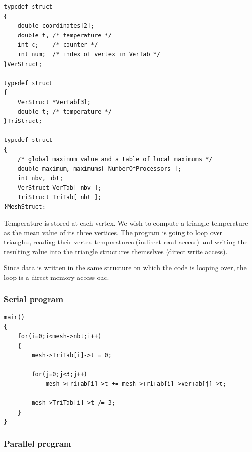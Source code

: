 \documentclass[a4paper,12pt]{article}
\begin{document}
\begin{tt}
\begin{verbatim}
typedef struct
{
    double coordinates[2];
    double t; /* temperature */
    int c;    /* counter */
    int num;  /* index of vertex in VerTab */
}VerStruct;

typedef struct
{
    VerStruct *VerTab[3];
    double t; /* temperature */
}TriStruct;

typedef struct
{
    /* global maximum value and a table of local maximums */
    double maximum, maximums[ NumberOfProcessors ];
    int nbv, nbt;
    VerStruct VerTab[ nbv ];
    TriStruct TriTab[ nbt ];
}MeshStruct;
\end{verbatim}
\end{tt}
\normalfont

Temperature is stored at each vertex. We wish to compute a triangle temperature as the mean value of its three vertices. The program is going to loop over triangles, reading their vertex temperatures (indirect read access) and writing the resulting value into the triangle structures themselves (direct write access).

Since data is written in the same structure on which the code is looping over, the loop is a direct memory access one.

\subsubsection{Serial program}

\begin{tt}
\begin{verbatim}
main()
{
    for(i=0;i<mesh->nbt;i++)
    {
        mesh->TriTab[i]->t = 0;

        for(j=0;j<3;j++)
            mesh->TriTab[i]->t += mesh->TriTab[i]->VerTab[j]->t;

        mesh->TriTab[i]->t /= 3;
    }
}
\end{verbatim}
\end{tt}
\normalfont

\subsubsection{Parallel program}
\end{document}
